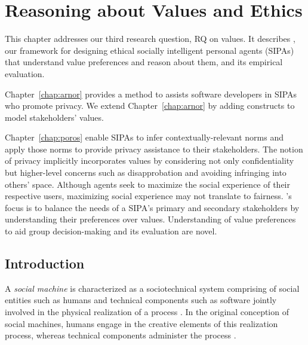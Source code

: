 \chapter{Reasoning about Values and Ethics}
\label{chap:ainur}

This chapter addresses our third research question, RQ on values. It describes \frameworkAinur, our framework for 
designing ethical socially intelligent personal agents (SIPAs) that understand value preferences and
reason about them, and its empirical evaluation.

Chapter~\ref{chap:arnor} provides a method to assists software developers in SIPAs who promote privacy. We extend Chapter~\ref{chap:arnor} by adding constructs to model stakeholders' values. 

Chapter~\ref{chap:poros} enable SIPAs to infer contextually-relevant norms and apply those norms to provide privacy assistance to their stakeholders. The notion of privacy implicitly incorporates values by considering not only confidentiality but higher-level concerns such as disapprobation and avoiding infringing into others' space. 
Although \frameworkB agents seek to maximize the social experience of their respective users, maximizing social experience may not translate to fairness. 
\frameworkAinur's focus is to balance the needs of a SIPA's primary and secondary stakeholders by understanding their preferences over values. Understanding of value preferences to aid group decision-making and its evaluation are novel.



\section{Introduction}

A \emph{social machine} is characterized as a sociotechnical system comprising of social entities such as humans and technical components such as software jointly involved in the physical realization of a process \citep{Smart+14:social-machines,WWW-16:IOSE}. 
In the original conception of social machines, humans engage in the creative elements of this realization process, whereas technical components  administer the process \citep{Berners-Lee-99:Weaving}.

